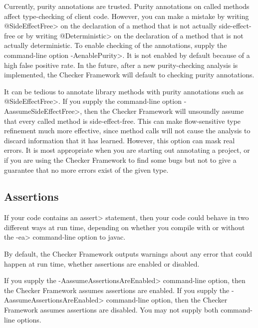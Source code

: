
Currently, purity annotations are trusted.  Purity annotations on called
methods affect type-checking of client code.  However, you can make a
mistake by writing \<@SideEffectFree> on the declaration of a method that
is not actually side-effect-free or by writing \<@Deterministic> on the
declaration of a method that is not actually deterministic.  To enable
checking of the annotations, supply the command-line option
\<-AenablePurity>.  It is not enabled by default because of a high false
positive rate.  In the future, after a new purity-checking analysis is
implemented, the Checker Framework will default to checking purity
annotations.

It can be tedious to annotate library methods with purity annotations such
as \<@SideEffectFree>.  If you supply the command-line option
\<-AassumeSideEffectFree>, then the Checker Framework will unsoundly
assume that every called method is side-effect-free.  This can make
flow-sensitive type refinement much more effective, since method calls will
not cause the analysis to discard information that it has learned.
However, this option can mask real errors.  It is most appropriate when you
are starting out annotating a project, or if you are using the Checker
Framework to find some bugs but not to give a guarantee that no more errors
exist of the given type.


\subsection{Assertions\label{type-refinement-assertions}}

If your code contains an \<assert> statement, then your code could behave
in two different ways at run time, depending on whether you compile with or
without the \<-ea> command-line option to javac.

By default, the Checker Framework outputs warnings about any error that
could happen at run time, whether assertions are enabled or disabled.

If you supply the \<-AassumeAssertionsAreEnabled> command-line option, then
the Checker Framework assumes assertions are enabled.  If you supply the
\<-AassumeAssertionsAreEnabled> command-line option, then the Checker
Framework assumes assertions are disabled.  You may not supply both
command-line options.


